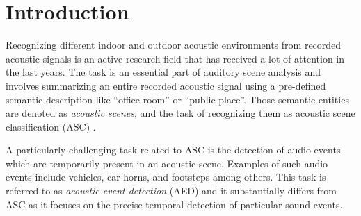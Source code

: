 \documentclass[applsci,article,submit,oneauthor,pdftex]{Definitions/mdpi}
\begin{document}

\section{Introduction}

Recognizing different indoor and outdoor acoustic environments 
from recorded acoustic signals is an active research field that has received a lot of attention in the last years. The task is an essential part of auditory scene analysis and 
involves summarizing an entire recorded acoustic signal using a pre-defined semantic description
like ``office room'' or ``public place''. 
Those semantic entities are denoted as \textit{acoustic scenes}, and the task of recognizing them as acoustic scene classification (ASC) \citep{Virtanen:2018:SoundSceneBook:BOOK}.

A particularly challenging task related to ASC is the detection 
of audio events which are temporarily present in an acoustic scene.
Examples of such audio events include vehicles, car horns, and footsteps among others. This task is referred to as \textit{acoustic event detection} (AED) and it substantially differs from ASC 
as it focuses
on the precise temporal detection of particular sound events.
\end{document}

